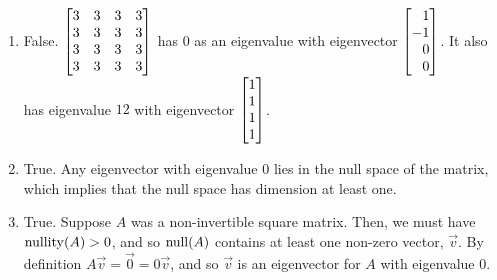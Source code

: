\begin{exercises}
\begin{problist}
\begin{solution}
\begin{enumerate}
				\item False. $\mat{3 & 3 & 3 & 3 \\ 3 & 3 & 3 & 3\\3 & 3 &
					3 & 3\\3 & 3 & 3 & 3}$ has $0$ as an eigenvalue with
					eigenvector $\mat{1 \\ -1 \\ 0 \\ 0}$. It also has
					eigenvalue $12$ with eigenvector
					$\mat{1 \\ 1 \\ 1 \\ 1}$.

				\item True. Any eigenvector with eigenvalue $0$ lies in the
					null space of the matrix, which implies that the null
					space has dimension at least one.

				\item True. Suppose $A$ was a non-invertible square matrix.
					Then, we must have $\operatorname{nullity}(A)>0$, and so $\operatorname{null}(A)$
					contains at least one non-zero vector, $\vec v$. By
					definition $A\vec v=\vec 0=0\vec v$, and so $\vec v$ is
					an eigenvector for $A$ with eigenvalue $0$.
			\end{enumerate}
		\end{solution}
	\end{problist}
\end{exercises}
